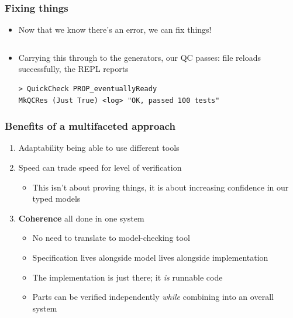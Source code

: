 \documentclass[compress,handout]{beamer}
\begin{document}
\begin{frame}[fragile]
  \frametitle{Fixing things}

  \begin{itemize}
    \item<1-> Now that we know there's an error, we can fix things!
              \inputminted[fontsize=\scriptsize]{Idris}{qc-things/ATM-fixed-chkpin.idr}

    \item<2-> Carrying this through to the generators, our QC passes: file reloads
              successfully, the REPL reports
              \begin{verbatim}
> QuickCheck PROP_eventuallyReady
MkQCRes (Just True) <log> "OK, passed 100 tests"
              \end{verbatim}
  \end{itemize}

  \vspace*{-3mm}

\end{frame}


\begin{frame}
  \frametitle{Benefits of a multifaceted approach}

  \begin{enumerate}
    \item<1-> Adaptability {\textemdash} being able to use different tools
    \item<2-> Speed {\textemdash} can trade speed for level of verification
    \begin{itemize}
      \item<2-> This isn't about proving things, it is about increasing
                confidence in our typed models
    \end{itemize}
    \item<3-> \textbf{Coherence} {\textemdash} all done in one system
      \begin{itemize}
        \item<4-> No need to translate to model-checking tool
        \item<5-> Specification lives alongside model lives alongside
                  implementation
        \item<6-> The implementation is just there; it \emph{is} runnable code
        \item<7-> Parts can be verified independently \emph{while} combining into an
                  overall system
      \end{itemize}
  \end{enumerate}

\end{frame}
\end{document}
